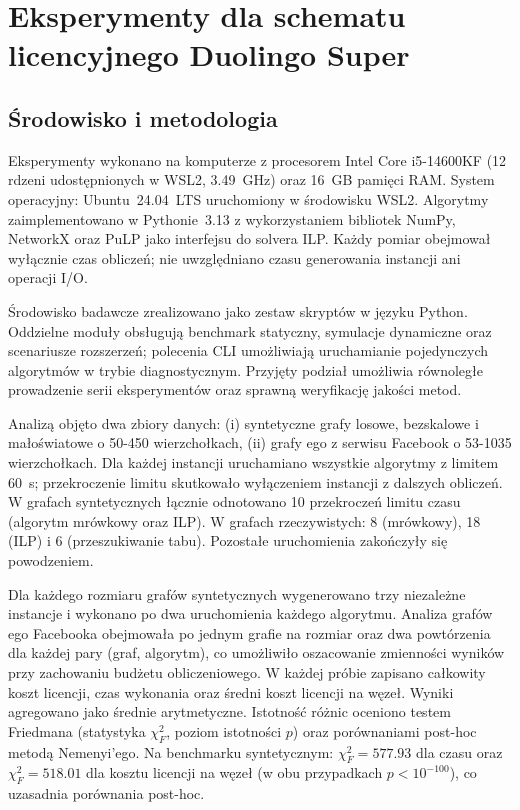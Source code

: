 \chapter{Eksperymenty dla schematu licencyjnego Duolingo Super}
\label{chap:experiments}
\section{Środowisko i metodologia}

Eksperymenty wykonano na komputerze z procesorem Intel Core i5-14600KF (12 rdzeni udostępnionych w WSL2, 3.49~GHz) oraz 16~GB pamięci RAM. System operacyjny: Ubuntu~24.04~LTS uruchomiony w środowisku WSL2. Algorytmy zaimplementowano w Pythonie~3.13 z wykorzystaniem bibliotek NumPy, NetworkX oraz PuLP jako interfejsu do solvera ILP. Każdy pomiar obejmował wyłącznie czas obliczeń; nie uwzględniano czasu generowania instancji ani operacji I/O.

Środowisko badawcze zrealizowano jako zestaw skryptów w języku Python. Oddzielne moduły obsługują benchmark statyczny, symulacje dynamiczne oraz scenariusze rozszerzeń; polecenia CLI umożliwiają uruchamianie pojedynczych algorytmów w trybie diagnostycznym. Przyjęty podział umożliwia równoległe prowadzenie serii eksperymentów oraz sprawną weryfikację jakości metod.

Analizą objęto dwa zbiory danych: (i) syntetyczne grafy losowe, bezskalowe i małoświatowe o 50-450 wierzchołkach, (ii) grafy ego z serwisu Facebook o 53-1035 wierzchołkach. Dla każdej instancji uruchamiano wszystkie algorytmy z limitem 60~s; przekroczenie limitu skutkowało wyłączeniem instancji z dalszych obliczeń. W grafach syntetycznych łącznie odnotowano 10 przekroczeń limitu czasu (algorytm mrówkowy oraz ILP). W grafach rzeczywistych: 8 (mrówkowy), 18 (ILP) i 6 (przeszukiwanie tabu). Pozostałe uruchomienia zakończyły się powodzeniem.

Dla każdego rozmiaru grafów syntetycznych wygenerowano trzy niezależne instancje i wykonano po dwa uruchomienia każdego algorytmu. Analiza grafów ego Facebooka obejmowała po jednym grafie na rozmiar oraz dwa powtórzenia dla każdej pary (graf, algorytm), co umożliwiło oszacowanie zmienności wyników przy zachowaniu budżetu obliczeniowego. W każdej próbie zapisano całkowity koszt licencji, czas wykonania oraz średni koszt licencji na węzeł. Wyniki agregowano jako średnie arytmetyczne. Istotność różnic oceniono testem Friedmana (statystyka $\chi^2_F$, poziom istotności $p$) oraz porównaniami post-hoc metodą Nemenyi’ego. Na benchmarku syntetycznym: $\chi^2_F=577.93$ dla czasu oraz $\chi^2_F=518.01$ dla kosztu licencji na węzeł (w obu przypadkach $p<10^{-100}$), co uzasadnia porównania post-hoc.

